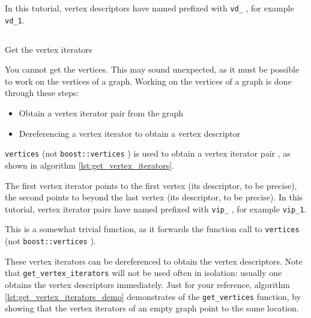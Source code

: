 In this tutorial, 
vertex descriptors have named prefixed with \verb;vd_; , 
for example \verb;vd_1;.

\subsection{}
Get the vertex iterators
\label{subsec:get_vertices}

You cannot get the vertices.
This may sound unexpected, as it must be possible to work on the vertices
of a graph.
Working on the vertices of a graph is done through these steps:

\begin{itemize}
  \item Obtain a vertex iterator pair from the graph
  \item Dereferencing a vertex iterator to obtain a vertex descriptor 
\end{itemize}

\verb;vertices;  
(not \verb;boost::vertices; ) 
is used to obtain 
a vertex iterator pair , 
as shown in algorithm \ref{lst:get_vertex_iterators}.

The first vertex iterator 
points to the first vertex (its descriptor, to be precise), the second
points to beyond the last vertex (its descriptor, to be precise).
In this tutorial, vertex iterator pairs have named prefixed with 
\verb;vip_; , for example \verb;vip_1;.



This is a somewhat trivial function, 
as it forwards the function call to
\verb;vertices; 
(not \verb;boost::vertices; ).

These vertex iterators can be dereferenced to obtain the vertex descriptors.
Note that \verb;get_vertex_iterators; will not be used often in isolation: usually
one obtains the vertex descriptors immediately.
Just for your reference, algorithm 
\ref{lst:get_vertex_iterators_demo}
demonstrates of the \verb;get_vertices; function, by showing that the vertex
iterators of an empty graph point to the same location.

